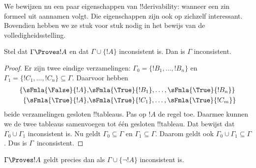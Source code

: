 \documentclass[openany]{memoir}
\begin{document}
\begingroup
\def\olfilename{OLP-0106}
\def\olfilepath{content/first-order-logic/tableaux/}
\hypertarget{unit-OLP-0106}{}



      {}
      {}


We bewijzen nu een paar eigenschappen van !!{derivability}: wanneer
een zin formeel uit aannamen volgt. Die eigenschappen zijn ook op
zichzelf interessant. Bovendien hebben we ze stuk voor stuk nodig in
het bewijs van de volledigheidsstelling.

\begin{prop}
  Stel dat $\Gamma \Proves !A$ en dat $\Gamma \cup \{!A\}$
  inconsistent is. Dan is $\Gamma$ inconsistent.
\end{prop}

\begin{proof}
Er zijn twee eindige verzamelingen:
$\Gamma_0 = \{!B_1, \dots, !B_n\}$ en
$\Gamma_1 =\{!C_1, \dots, !C_n\} \subseteq \Gamma$. Daarvoor hebben
  \begin{align*}
    \{\sFmla{\False}{!A}, &
    \sFmla{\True}{!B_1}, \dots, \sFmla{\True}{!B_n}\} \\
    \{\sFmla{\True}{!A}, &
    \sFmla{\True}{!C_1}, \dots, \sFmla{\True}{!C_m}\}
  \end{align*}
  beide verzamelingen gesloten !!{tableau}s. Pas op $!A$ de regel
  \Cut{} toe. Daarmee kunnen we de twee tableaus samenvoegen tot één
  gesloten !!{tableau}. Dat bewijst dat
  $\Gamma_0 \cup \Gamma_1$ inconsistent is. Nu geldt
  $\Gamma_0 \subseteq \Gamma$ en $\Gamma_1 \subseteq \Gamma$. Daarom
  geldt ook $\Gamma_0 \cup \Gamma_1 \subseteq \Gamma$. Dus is
  $\Gamma$~inconsistent.
\end{proof}

\begin{prop}
$\Gamma \Proves !A$ geldt precies dan als
$\Gamma \cup \{\lnot !A\}$ inconsistent is.
\end{prop}
\end{document}
